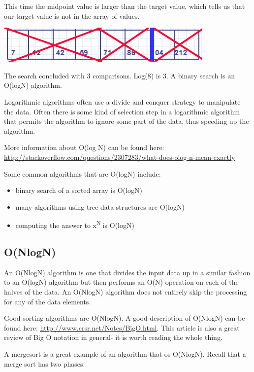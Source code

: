 This time the  midpoint value is larger than the target value, which tells us that our target value is not in the array of values.


\includegraphics{pictures/binarySearch4.png}

The search concluded with 3 comparisons.   Log(8)  is 3.  A binary search is an O(logN) algorithm.


Logarithmic algorithms often use a divide and conquer strategy to manipulate the data.   Often there is some kind of selection step in a logarithmic algorithm that permits the algorithm to ignore some part of the data, thus speeding up the algorithm.


More information about O(log N) can be found here:
\url{http://stackoverflow.com/questions/2307283/what-does-olog-n-mean-exactly}


Some common algorithms that are O(logN) include:
\begin{itemize}

\item binary search of a sorted array is O(logN)
\item many algorithms using tree data structures are O(logN)
\item  computing the answer to x\textsuperscript{N{ }}is O(logN)
\end{itemize}


\subsection{O(NlogN)}

An O(NlogN) algorithm is one that divides the input data
up in a similar fashion to an O(logN) algorithm but then performs an O(N)
operation on each of the halves of the data.   An O(NlogN) algorithm does not entirely skip the processing for any of the data elements.

Good sorting algorithms are O(NlogN). A good description of O(NlogN) can
be found here: \url{http://www.crsr.net/Notes/BigO.html}. This article
is also a great review of Big O notation in general- it is worth reading the whole
thing.

A mergesort is a great example of an algorithm that os O(NlogN).   Recall that a merge sort has two phases:

